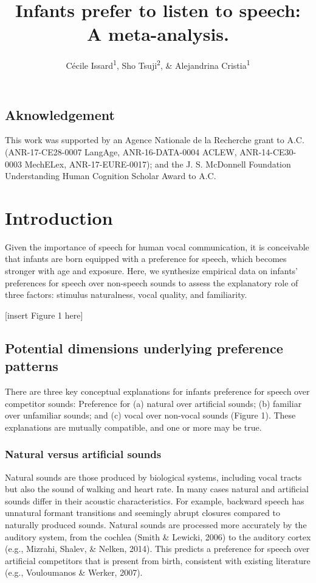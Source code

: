 \documentclass[man]{apa6}
\title{Infants prefer to listen to speech: A meta-analysis.}
\author{Cécile Issard\textsuperscript{1}, Sho Tsuji\textsuperscript{2}, \&
Alejandrina Cristia\textsuperscript{1}}
\date{}
\affiliation{
\vspace{0.5cm}
\textsuperscript{1} Laboratoire de Sciences Cognitives et Psycholinguistique, Ecole Normale Supérieure, Département d'Études Cognitives\\\textsuperscript{2} International Research Center for Neurointelligence, The University of Tokyo}
\begin{document}
\maketitle

\subsection{Aknowledgement}\label{aknowledgement}

This work was supported by an Agence Nationale de la Recherche grant to
A.C. (ANR-17-CE28-0007 LangAge, ANR-16-DATA-0004 ACLEW, ANR-14-CE30-0003
MechELex, ANR-17-EURE-0017); and the J. S. McDonnell Foundation
Understanding Human Cognition Scholar Award to A.C.

\section{Introduction}\label{introduction}

Given the importance of speech for human vocal communication, it is
conceivable that infants are born equipped with a preference for speech,
which becomes stronger with age and exposure. Here, we synthesize
empirical data on infants' preferences for speech over non-speech sounds
to assess the explanatory role of three factors: stimulus naturalness,
vocal quality, and familiarity.

{[}insert Figure 1 here{]}

\subsection{Potential dimensions underlying preference
patterns}\label{potential-dimensions-underlying-preference-patterns}

There are three key conceptual explanations for infants preference for
speech over competitor sounds: Preference for (a) natural over
artificial sounds; (b) familiar over unfamiliar sounds; and (c) vocal
over non-vocal sounds (Figure 1). These explanations are mutually
compatible, and one or more may be true.

\subsubsection{Natural versus artificial
sounds}\label{natural-versus-artificial-sounds}

Natural sounds are those produced by biological systems, including vocal
tracts but also the sound of walking and heart rate. In many cases
natural and artificial sounds differ in their acoustic characteristics.
For example, backward speech has unnatural formant transitions and
seemingly abrupt closures compared to naturally produced sounds. Natural
sounds are processed more accurately by the auditory system, from the
cochlea (Smith \& Lewicki, 2006) to the auditory cortex (e.g., Mizrahi,
Shalev, \& Nelken, 2014). This predicts a preference for speech over
artificial competitors that is present from birth, consistent with
existing literature (e.g., Vouloumanos \& Werker, 2007).
\end{document}
